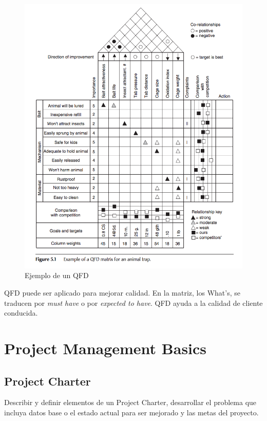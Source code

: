 \documentclass[]{article}
\begin{document}
\begin{figure}[ht!]
	\centering
	\includegraphics[width=150mm]{imagenes/ExampleQFD.png}
	\caption{Ejemplo de un QFD}
	\label{fig:ExampleQFD}
\end{figure}

QFD puede ser aplicado para mejorar calidad. En la matriz, los What's, se traducen por \textit{must have} o por \textit{expected to have}. QFD ayuda a la calidad de cliente conducida.

\section{Project Management Basics}

\subsection{Project Charter}

Describir y definir elementos de un Project Charter, desarrollar el problema que incluya datos base o el estado actual para ser mejorado y las metas del proyecto.
\end{document}
